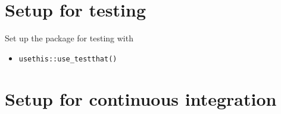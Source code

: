 \documentclass{article}
\begin{document}
\section{Setup for testing}
\label{sec:testing_setup}

Set up the package for testing with

\begin{itemize}

  \item \verb|usethis::use_testthat()|

\end{itemize}


\section{Setup for continuous integration}
\label{sec:ci_setup}
\end{document}
